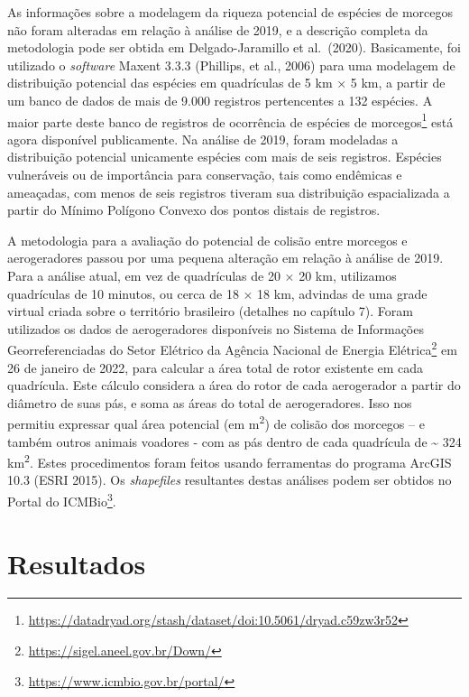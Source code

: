 \documentclass[
  oneside]{scrbook}
\DeclareRobustCommand{\href}[2]{#2\footnote{\url{#1}}}
\begin{document}
As informações sobre a modelagem da riqueza potencial de espécies de morcegos não foram alteradas em relação à análise de 2019, e a descrição completa da metodologia pode ser obtida em Delgado-Jaramillo et al.~(2020). Basicamente, foi utilizado o \emph{software} Maxent 3.3.3 (Phillips, et al., 2006) para uma modelagem de distribuição potencial das espécies em quadrículas de 5 km × 5 km, a partir de um banco de dados de mais de 9.000 registros pertencentes a 132 espécies. A maior parte deste \href{https://datadryad.org/stash/dataset/doi:10.5061/dryad.c59zw3r52}{banco de registros de ocorrência de espécies de morcegos} está agora disponível publicamente. Na análise de 2019, foram modeladas a distribuição potencial unicamente espécies com mais de seis registros. Espécies vulneráveis ou de importância para conservação, tais como endêmicas e ameaçadas, com menos de seis registros tiveram sua distribuição espacializada a partir do Mínimo Polígono Convexo dos pontos distais de registros.

A metodologia para a avaliação do potencial de colisão entre morcegos e aerogeradores passou por uma pequena alteração em relação à análise de 2019. Para a análise atual, em vez de quadrículas de 20 × 20 km, utilizamos quadrículas de 10 minutos, ou cerca de 18 × 18 km, advindas de uma grade virtual criada sobre o território brasileiro (detalhes no capítulo 7). Foram utilizados os dados de aerogeradores disponíveis no \href{https://sigel.aneel.gov.br/Down/}{Sistema de Informações Georreferenciadas do Setor Elétrico da Agência Nacional de Energia Elétrica} em 26 de janeiro de 2022, para calcular a área total de rotor existente em cada quadrícula. Este cálculo considera a área do rotor de cada aerogerador a partir do diâmetro de suas pás, e soma as áreas do total de aerogeradores. Isso nos permitiu expressar qual área potencial (em m\textsuperscript{2}) de colisão dos morcegos -- e também outros animais voadores - com as pás dentro de cada quadrícula de \textasciitilde{} 324 km\textsuperscript{2}. Estes procedimentos foram feitos usando ferramentas do programa ArcGIS 10.3 (ESRI 2015). Os \emph{shapefiles} resultantes destas análises podem ser obtidos no \href{https://www.icmbio.gov.br/portal/}{Portal do ICMBio}.

\hypertarget{resultados-2}{%
\section{Resultados}\label{resultados-2}}
\end{document}
